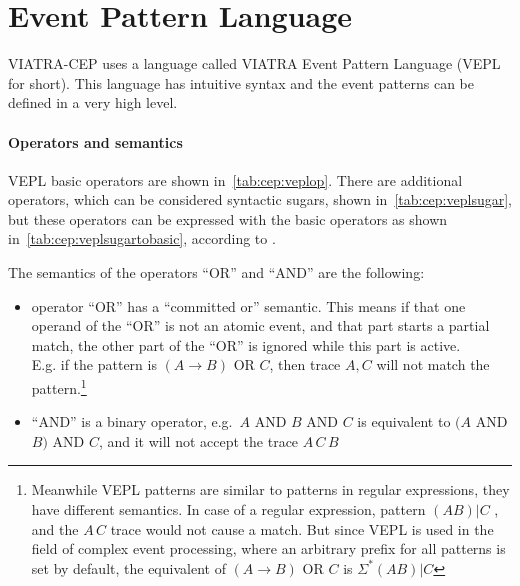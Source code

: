 \section{Event Pattern Language}
VIATRA-CEP uses a language called VIATRA Event Pattern Language (VEPL for short).
This language has intuitive syntax and the event patterns can be defined in
a very high level. 

\paragraph{Operators and semantics}
VEPL basic operators are shown in~\cref{tab:cep:veplop}.
There are additional operators, which can be considered syntactic sugars, shown in~\cref{tab:cep:veplsugar},
but these operators can be expressed with the basic operators as shown in~\cref{tab:cep:veplsugartobasic}, according to \citep{CEP}.

The semantics of the operators ``OR'' and ``AND'' are the following:
\begin{itemize}
	\item operator ``OR'' has a ``committed or'' semantic. This means if that one operand of the ``OR'' is not an atomic event, and that part starts a partial match, the other part of the ``OR'' is ignored while this part is active. \\
	E.g. if the pattern is $(A \rightarrow B)$ OR $C$,
	then trace $A,C$ will not match the pattern.\footnote{Meanwhile VEPL patterns are similar to patterns in regular expressions, they have different semantics. In case of a regular expression, pattern $(AB)|C$ , and the $A\,C$ trace would not cause a match. But since VEPL is used in the field of complex event processing, where an arbitrary prefix for all patterns is set by default, the equivalent of $(A \rightarrow B)$ OR $C$ is $\Sigma^\ast (AB)|C$}
	\item ``AND'' is a binary operator, e.g.~$A$ AND $B$ AND $C$ is equivalent to $(A$ AND $B)$ AND $C$,
	and it will not accept the trace $A\,C\,B$
\end{itemize}

